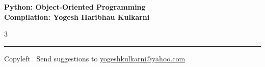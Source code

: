 \documentclass[8pt,landscape]{article}
\begin{document}
\footnotesize


\begin{center}
\Large{\textbf{Python: Object-Oriented Programming\\ Compilation: Yogesh Haribhau Kulkarni}}
\end{center}

\begin{multicols}{3}

\end{multicols}

\rule{\linewidth}{0.25pt}
\scriptsize
Copyleft \textcopyleft\  Send suggestions to
\href{http://www.yogeshkulkarni.com}{yogeshkulkarni@yahoo.com}
\end{document}

